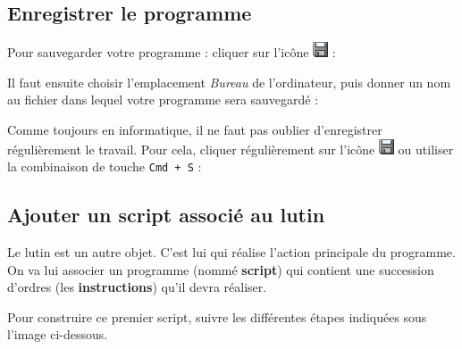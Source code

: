 





\subsection{Enregistrer le programme}

Pour sauvegarder votre programme : cliquer sur l'icône \includegraphics[width=.4cm]{./images/scratch/Sauver} :


Il faut ensuite choisir l'emplacement \emph{Bureau} de l'ordinateur, puis donner un nom au fichier dans lequel votre programme sera sauvegardé :



Comme toujours en informatique, il ne faut pas oublier d'enregistrer régulièrement le travail. Pour cela, cliquer régulièrement sur l'icône \includegraphics[width=.4cm]{./images/scratch/Sauver} ou utiliser la combinaison de touche \texttt{Cmd + S} :










\subsection{Ajouter un script associé au lutin}\label{ScriptLutin}

Le lutin est un autre objet. C'est lui qui réalise l'action principale du programme. On va lui associer un programme (nommé \textbf{script}) qui contient une succession d'ordres (les \textbf{instructions}) qu'il devra réaliser.  

Pour construire ce premier script, suivre les différentes étapes indiquées sous l'image ci-dessous.

